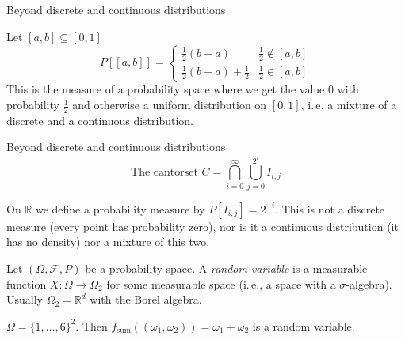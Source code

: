 \documentclass[compress]{beamer}
\newcommand{\RR}{\mathbb{R}}
\begin{document}
\begin{frame}{Beyond discrete and continuous distributions}
  \begin{example}
    Let $[a,b]\subseteq [0,1]$
    \[
      P[[a,b]]=
      \begin{cases}
        \tfrac12(b-a) & \tfrac12 \notin [a,b]\\
        \tfrac12(b-a) + \tfrac12 & \frac12 \in [a,b]
      \end{cases}
    \]
    This is the measure of a probability space where we get the value $0$ with
    probability $\tfrac12$ and otherwise a uniform distribution on $[0,1]$,
    i.\,e. a mixture of a discrete and a continuous distribution.
  \end{example}
\end{frame}

\begin{frame}{Beyond discrete and continuous distributions}
  \[\text{The cantorset } C = \bigcap_{i=0}^\infty \bigcup_{j=0}^{2^i} I_{i,j}\]
  \begin{center}
    \begin{tikzpicture}
      
    \end{tikzpicture}
  \end{center}
  \pause
  \begin{example}
    On $\RR$ we define a probability measure by $P[I_{i,j}] = 2^{-i}$. This is
    not a discrete measure (every point has probability zero), nor is it a
    continuous distribution (it has no density) nor a mixture of this two.
  \end{example}
\end{frame}

\begin{frame}
  \begin{definition}
    Let $(\Omega, \mathcal{F}, P)$ be a probability space. A \textit{random
      variable} is a measurable function $X: \Omega \to \Omega_2$ for some
    measurable space (i.\,e., a space with a $\sigma$-algebra). Usually
    $\Omega_2=\RR^d$ with the Borel algebra.
  \end{definition}

  \begin{example}
    $\Omega=\{1, \dots, 6\}^2$. Then $f_{\text{sum}}((\omega_1, \omega_2)) =
    \omega_1+ \omega_2$ is a random variable.
  \end{example}
\end{frame}
\end{document}
